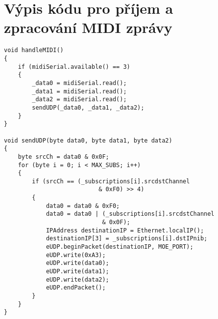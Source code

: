 \section{Výpis kódu pro příjem a zpracování \acs{MIDI} zprávy}\label{code:handleMIDI}
\begin{lstlisting}[caption=Výpis kódu pro příjem a zpracování MIDI zprávy]
void handleMIDI()
{
	if (midiSerial.available() == 3)
    {
        _data0 = midiSerial.read();
        _data1 = midiSerial.read();
        _data2 = midiSerial.read();
        sendUDP(_data0, _data1, _data2);
    }
}
	
void sendUDP(byte data0, byte data1, byte data2)
{
	byte srcCh = data0 & 0x0F;
	for (byte i = 0; i < MAX_SUBS; i++)
	{
		if (srcCh == (_subscriptions[i].srcdstChannel 
					       & 0xF0) >> 4)
		{
			data0 = data0 & 0xF0;
			data0 = data0 | (_subscriptions[i].srcdstChannel 
							& 0x0F);
			IPAddress destinationIP = Ethernet.localIP();
			destinationIP[3] = _subscriptions[i].dstIPnib;
			eUDP.beginPacket(destinationIP, MOE_PORT);
			eUDP.write(0xA3);
			eUDP.write(data0);
			eUDP.write(data1);
			eUDP.write(data2);
			eUDP.endPacket();
		}
	}
}
\end{lstlisting}






